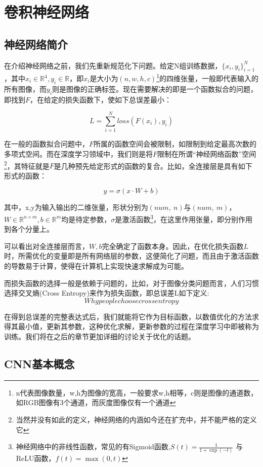 \chapter{卷积神经网络}

\section{神经网络简介}

在介绍神经网络之前，我们先重新规范化下问题。给定N组训练数据，$\{x_i, y_i\}_{i=1}^N$，其中$x_i \in \mathbb{R}^4, y_i \in \mathbb{R}$，即$x_i$是大小为$(n, w, h, c)$\footnote{n代表图像数量，w,h为图像的宽高，一般要求w,h相等，c则是图像的通道数，如RGB图像有3个通道，而灰度图像仅有一个通道}的四维张量，一般即代表输入的所有图像，而$y_i$则是图像的正确标签。现在需要解决的即是一个函数拟合的问题，即找到$F$，在给定的损失函数下，使如下总误差最小：

\[
L =\sum_{i=1}^N loss(F(x_i), y_i)
\]

在一般的函数拟合问题中，$F$所属的函数空间会被限制，如限制到给定最高次数的多项式空间。而在深度学习领域中，我们则是将$F$限制在所谓“神经网络函数”空间\footnote{当然并没有如此的定义，神经网络的内涵如今还在扩充中，并不能严格的定义它}，其特征就是$F$是几种预先给定形式的函数的复合。比如，全连接层是具有如下形式的函数：

\[
	y = \sigma (x \cdot W + b)
\]

其中，x,y为输入输出的二维张量，形状分别为$(num,\  n)$与$(num,\  m)$，$W \in \mathbb{R}^{n \times m}, b \in \mathbb{R}^m $均是待定参数，$\sigma$是激活函数\footnote{神经网络中的非线性函数，常见的有Sigmoid函数,$S(t) = \frac{1}{1 + \exp(-t)}$ 与ReLU函数，$f(t) = \max(0, t)$}，在这里作用张量，即分别作用到各个分量上。

可以看出对全连接层而言，$W,b$完全确定了函数本身。因此，在优化损失函数$L$时，所需优化的变量即是所有网络层的参数，这便简化了问题，而且由于激活函数的导数易于计算，使得在计算机上实现快速求解成为可能。

而损失函数的选择一般是依赖于问题的，比如，对于图像分类问题而言，人们习惯选择交叉熵(Cross Entropy)来作为损失函数，即总误差L如下定义:
\[
	Why people choose cross entropy
\]

在得到总误差的完整表达式后，我们就能将它作为目标函数，以数值优化的方法求得其最小值，更新其参数，这种优化求解，更新参数的过程在深度学习中即被称为训练。我们将在之后的章节更加详细的讨论关于优化的话题。

\section{CNN基本概念}

